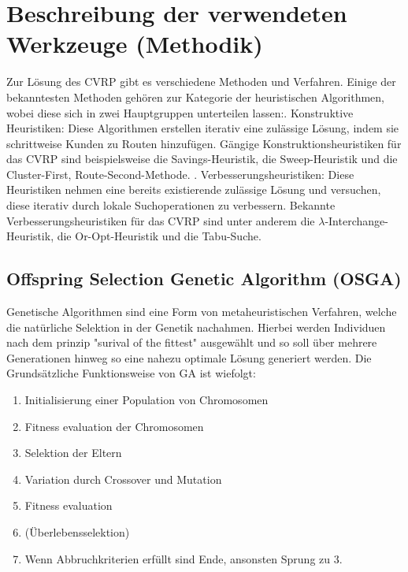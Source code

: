 \documentclass{IEEEtran}
\begin{document}
\section{Beschreibung der verwendeten Werkzeuge (Methodik)}
    Zur Lösung des CVRP gibt es verschiedene Methoden und Verfahren. 
    Einige der bekanntesten Methoden gehören zur Kategorie der heuristischen
    Algorithmen, wobei diese sich in zwei Hauptgruppen
    unterteilen lassen:\newline{}. Konstruktive Heuristiken: Diese Algorithmen erstellen iterativ eine zulässige 
    Lösung, indem sie schrittweise Kunden zu Routen hinzufügen. Gängige 
    Konstruktionsheuristiken für das CVRP sind beispielsweise die Savings-Heuristik, 
    die Sweep-Heuristik und die Cluster-First, Route-Second-Methode. \newline{}. Verbesserungsheuristiken: Diese Heuristiken nehmen eine bereits existierende 
    zulässige Lösung und versuchen, diese iterativ durch lokale Suchoperationen zu 
    verbessern. Bekannte Verbesserungsheuristiken für das CVRP sind unter anderem die 
    $\lambda$-Interchange-Heuristik, die Or-Opt-Heuristik und die Tabu-Suche.

\subsection{Offspring Selection Genetic Algorithm (OSGA)}
Genetische Algorithmen sind eine Form von metaheuristischen Verfahren, welche die natürliche Selektion in der Genetik nachahmen. 
Hierbei werden Individuen nach dem prinzip "surival of the fittest" ausgewählt und so soll über mehrere Generationen hinweg so eine nahezu optimale Lösung generiert werden.
Die Grundsätzliche Funktionsweise von GA ist wiefolgt\cite{Winkler2024}:
\begin{enumerate}
    \item Initialisierung einer Population von Chromosomen
    \item Fitness evaluation der Chromosomen
    \item Selektion der Eltern
    \item Variation durch Crossover und Mutation
    \item Fitness evaluation
    \item (Überlebensselektion)
    \item Wenn Abbruchkriterien erfüllt sind Ende, ansonsten Sprung zu 3.
\end{enumerate}
\end{document}
